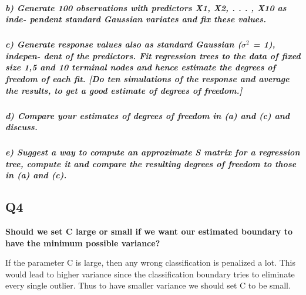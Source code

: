 \documentclass[]{article}
\let\oldsubparagraph\subparagraph
\renewcommand{\subparagraph}[1]{\oldsubparagraph{#1}\mbox{}}
\begin{document}
\subparagraph{b) Generate 100 observations with predictors X1, X2, . . .
, X10 as inde- pendent standard Gaussian variates and fix these
values.}\label{b-generate-100-observations-with-predictors-x1-x2-.-.-.-x10-as-inde--pendent-standard-gaussian-variates-and-fix-these-values.}

\subparagraph{\texorpdfstring{c) Generate response values also as
standard Gaussian (\(\sigma^2\) = 1), indepen- dent of the predictors.
Fit regression trees to the data of fixed size 1,5 and 10 terminal nodes
and hence estimate the degrees of freedom of each fit. {[}Do ten
simulations of the response and average the results, to get a good
estimate of degrees of
freedom.{]}}{c) Generate response values also as standard Gaussian (\textbackslash{}sigma\^{}2 = 1), indepen- dent of the predictors. Fit regression trees to the data of fixed size 1,5 and 10 terminal nodes and hence estimate the degrees of freedom of each fit. {[}Do ten simulations of the response and average the results, to get a good estimate of degrees of freedom.{]}}}\label{c-generate-response-values-also-as-standard-gaussian-sigma2-1-indepen--dent-of-the-predictors.-fit-regression-trees-to-the-data-of-fixed-size-15-and-10-terminal-nodes-and-hence-estimate-the-degrees-of-freedom-of-each-fit.-do-ten-simulations-of-the-response-and-average-the-results-to-get-a-good-estimate-of-degrees-of-freedom.}

\subparagraph{d) Compare your estimates of degrees of freedom in (a) and
(c) and
discuss.}\label{d-compare-your-estimates-of-degrees-of-freedom-in-a-and-c-and-discuss.}

\subparagraph{e) Suggest a way to compute an approximate S matrix for a
regression tree, compute it and compare the resulting degrees of freedom
to those in (a) and
(c).}\label{e-suggest-a-way-to-compute-an-approximate-s-matrix-for-a-regression-tree-compute-it-and-compare-the-resulting-degrees-of-freedom-to-those-in-a-and-c.}

\subsection{Q4}\label{q4}

\textbf{Should we set C large or small if we want our estimated boundary
to have the minimum possible variance?}

If the parameter C is large, then any wrong classification is penalized
a lot. This would lead to higher variance since the classification
boundary tries to eliminate every single outlier. Thus to have smaller
variance we should set C to be small.
\end{document}

